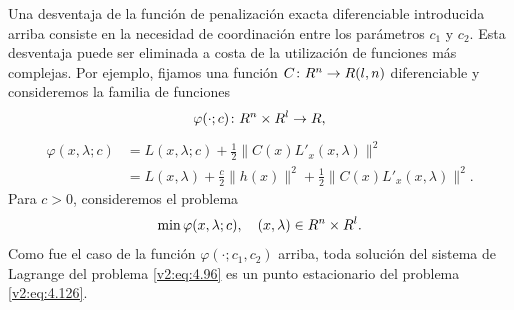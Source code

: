 Una desventaja de la función de penalización exacta diferenciable introducida arriba consiste en la necesidad de coordinación entre los parámetros $c_1$ y $c_2$. Esta desventaja puede ser eliminada a costa de la utilización de funciones más complejas. Por ejemplo, fijamos una función $C \colon R^n \to R(l, n)$ diferenciable y consideremos la familia de funciones
\[
    \varphi(\cdot; c) \colon R^n \times R^l \to R,
\]
\begin{align}
    \varphi(x, \lambda; c) &= L(x, \lambda; c) + \frac{1}{2}\|C(x)L'_x(x, \lambda)\|^2 \label{v2:eq:4.125} \\
    &= L(x, \lambda) + \frac{c}{2}\|h(x)\|^2 + \frac{1}{2}\|C(x)L'_x(x, \lambda)\|^2. \nonumber
\end{align}
Para $c > 0$, consideremos el problema
\begin{equation}
    \min \varphi(x, \lambda; c), \quad (x, \lambda) \in R^n \times R^l.
    \label{v2:eq:4.126}
\end{equation}
Como fue el caso de la función $\varphi(\cdot; c_1, c_2)$ arriba, toda solución del sistema de Lagrange del problema \eqref{v2:eq:4.96} es un punto estacionario del problema \eqref{v2:eq:4.126}.


